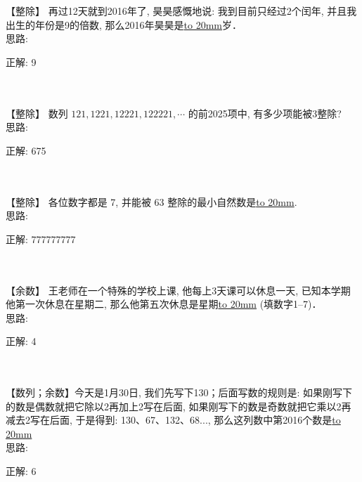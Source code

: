 
\item {
    【整除】
    再过12天就到2016年了, 昊昊感慨地说: 我到目前只经过2个闰年, 并且我出生的年份是9的倍数, 那么2016年昊昊是\underline{\hbox to 20mm{}}岁． 
    \ifshowSolution
        \fangsong{}
        \\
        思路:

        正解: 9 
    \else
        \\ \\ \\
    \fi
}

\item {
    【整除】
    数列 $121, 1221, 12221, 122221,\cdots$ 的前2025项中, 有多少项能被3整除? 
    \ifshowSolution
        \fangsong{}
        \\
        思路:

        正解: 675
    \else
        \\ \\ \\
    \fi
}

\item {
    【整除】
    各位数字都是 7, 并能被 63 整除的最小自然数是\underline{\hbox to 20mm{}}.
    \ifshowSolution
        \fangsong{}
        \\
        思路:

        正解: 777777777
    \else
        \\ \\ \\
    \fi
}

\item {
    【余数】
    王老师在一个特殊的学校上课, 他每上3天课可以休息一天, 已知本学期他第一次休息在星期二, 那么他第五次休息是星期\underline{\hbox to 20mm{}} (填数字1--7)．
    \ifshowSolution
        \fangsong{}
        \\
        思路:

        正解: 4
    \else
        \\ \\ \\
    \fi
}

\item {
    【数列；余数】今天是1月30日, 我们先写下130；后面写数的规则是: 如果刚写下的数是偶数就把它除以2再加上2写在后面, 如果刚写下的数是奇数就把它乘以2再减去2写在后面, 于是得到: 130、67、132、68..., 那么这列数中第2016个数是\underline{\hbox to 20mm{}}
    \ifshowSolution
        \fangsong{}
        \\
        思路:

        正解:  6
    \else
        \\ \\ \\
    \fi
}


